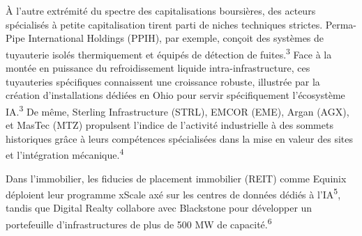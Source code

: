 \documentclass[11pt,a4paper]{article}
\begin{document}
À l'autre extrémité du spectre des capitalisations boursières, des acteurs spécialisés à petite capitalisation tirent parti de niches techniques strictes. Perma-Pipe International Holdings (PPIH), par exemple, conçoit des systèmes de tuyauterie isolés thermiquement et équipés de détection de fuites.\textsuperscript{3} Face à la montée en puissance du refroidissement liquide intra-infrastructure, ces tuyauteries spécifiques connaissent une croissance robuste, illustrée par la création d'installations dédiées en Ohio pour servir spécifiquement l'écosystème IA.\textsuperscript{3} De même, Sterling Infrastructure (STRL), EMCOR (EME), Argan (AGX), et MasTec (MTZ) propulsent l'indice de l'activité industrielle à des sommets historiques grâce à leurs compétences spécialisées dans la mise en valeur des sites et l'intégration mécanique.\textsuperscript{4}

Dans l'immobilier, les fiducies de placement immobilier (REIT) comme Equinix déploient leur programme xScale axé sur les centres de données dédiés à l'IA\textsuperscript{5}, tandis que Digital Realty collabore avec Blackstone pour développer un portefeuille d'infrastructures de plus de 500 MW de capacité.\textsuperscript{6}
\end{document}
